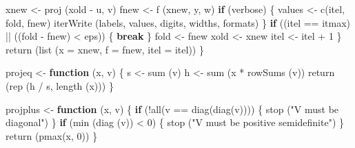 \documentclass[
  12pt,
  letterpaper,
  DIV=11,
  numbers=noendperiod]{scrreprt}
\newenvironment{Shaded}{\begin{snugshade}}{\end{snugshade}}
\newcommand{\AttributeTok}[1]{\textcolor[rgb]{0.40,0.45,0.13}{#1}}
\newcommand{\ControlFlowTok}[1]{\textcolor[rgb]{0.00,0.23,0.31}{\textbf{#1}}}
\newcommand{\DecValTok}[1]{\textcolor[rgb]{0.68,0.00,0.00}{#1}}
\newcommand{\FunctionTok}[1]{\textcolor[rgb]{0.28,0.35,0.67}{#1}}
\newcommand{\NormalTok}[1]{\textcolor[rgb]{0.00,0.23,0.31}{#1}}
\newcommand{\OtherTok}[1]{\textcolor[rgb]{0.00,0.23,0.31}{#1}}
\newcommand{\SpecialCharTok}[1]{\textcolor[rgb]{0.37,0.37,0.37}{#1}}
\newcommand{\StringTok}[1]{\textcolor[rgb]{0.13,0.47,0.30}{#1}}
\theoremstyle{remark}
\begin{document}
\begin{Shaded}
\begin{Highlighting}[]
\NormalTok{    xnew }\OtherTok{\textless{}{-}} \FunctionTok{proj}\NormalTok{ (xold }\SpecialCharTok{{-}}\NormalTok{ u, v)}
\NormalTok{    fnew }\OtherTok{\textless{}{-}} \FunctionTok{f}\NormalTok{ (xnew, y, w)}
    \ControlFlowTok{if}\NormalTok{ (verbose) \{}
\NormalTok{      values }\OtherTok{\textless{}{-}} \FunctionTok{c}\NormalTok{(itel, fold, fnew)}
      \FunctionTok{iterWrite}\NormalTok{ (labels, values, digits, widths, formats)}
\NormalTok{    \}}
    \ControlFlowTok{if}\NormalTok{ ((itel }\SpecialCharTok{==}\NormalTok{ itmax) }\SpecialCharTok{||}\NormalTok{ ((fold }\SpecialCharTok{{-}}\NormalTok{ fnew) }\SpecialCharTok{\textless{}}\NormalTok{ eps)) \{}
      \ControlFlowTok{break}
\NormalTok{    \}}
\NormalTok{    fold }\OtherTok{\textless{}{-}}\NormalTok{ fnew}
\NormalTok{    xold }\OtherTok{\textless{}{-}}\NormalTok{ xnew}
\NormalTok{    itel }\OtherTok{\textless{}{-}}\NormalTok{ itel }\SpecialCharTok{+} \DecValTok{1}
\NormalTok{  \}}
  \FunctionTok{return}\NormalTok{ (}\FunctionTok{list}\NormalTok{ (}\AttributeTok{x =}\NormalTok{ xnew, }\AttributeTok{f =}\NormalTok{ fnew, }\AttributeTok{itel =}\NormalTok{ itel))}
\NormalTok{\}}

\NormalTok{projeq }\OtherTok{\textless{}{-}} \ControlFlowTok{function}\NormalTok{ (x, v) \{}
\NormalTok{  s }\OtherTok{\textless{}{-}} \FunctionTok{sum}\NormalTok{ (v)}
\NormalTok{  h }\OtherTok{\textless{}{-}} \FunctionTok{sum}\NormalTok{ (x }\SpecialCharTok{*} \FunctionTok{rowSums}\NormalTok{ (v))}
  \FunctionTok{return}\NormalTok{ (}\FunctionTok{rep}\NormalTok{ (h }\SpecialCharTok{/}\NormalTok{ s, }\FunctionTok{length}\NormalTok{ (x)))}
\NormalTok{\}}

\NormalTok{projplus }\OtherTok{\textless{}{-}} \ControlFlowTok{function}\NormalTok{ (x, v) \{}
  \ControlFlowTok{if}\NormalTok{ (}\SpecialCharTok{!}\FunctionTok{all}\NormalTok{(v }\SpecialCharTok{==} \FunctionTok{diag}\NormalTok{(}\FunctionTok{diag}\NormalTok{(v)))) \{}
    \FunctionTok{stop}\NormalTok{ (}\StringTok{"V must be diagonal"}\NormalTok{)}
\NormalTok{  \}}
  \ControlFlowTok{if}\NormalTok{ (}\FunctionTok{min}\NormalTok{ (}\FunctionTok{diag}\NormalTok{ (v)) }\SpecialCharTok{\textless{}} \DecValTok{0}\NormalTok{) \{}
    \FunctionTok{stop}\NormalTok{ (}\StringTok{"V must be positive semidefinite"}\NormalTok{)}
\NormalTok{  \}}
  \FunctionTok{return}\NormalTok{ (}\FunctionTok{pmax}\NormalTok{(x, }\DecValTok{0}\NormalTok{))}
\NormalTok{\}}


\end{Highlighting}
\end{Shaded}
\end{document}
